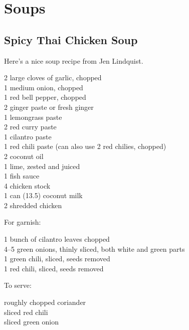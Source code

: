 \chapter{Soups}

\section{Spicy Thai Chicken Soup}

\begin{open}
    Here's a nice soup recipe from Jen Lindquist.
\end{open}
\begin{ingredients}
    2 large cloves of garlic, chopped\\
    1 medium onion, chopped\\
    1 red bell pepper, chopped\\
    \SI{2}{\tblspoon} ginger paste or fresh ginger\\
    \SI{1}{\tblspoon} lemongrass paste\\
    \SI{2}{\tblspoon} red curry paste\\
    \SI{1}{\tblspoon} cilantro paste\\
    \SI{1}{\tblspoon} red chili paste (can also use 2 red chilies, chopped)\\
    \SI{2}{\tblspoon} coconut oil\\
    1 lime, zested and juiced\\
    \SI{1}{\tblspoon} fish sauce\\
    \SI{4}{\cup} chicken stock\\
    1 can (\SI{13.5}{\fluidounce}) coconut milk\\
    \SI{2}{\cup} shredded chicken\\
\end{ingredients}
For garnish:
\begin{ingredients}
    1 bunch of cilantro leaves chopped\\
    \numrange{4}{5} green onions, thinly sliced, both white and green parts\\
    1 green chili, sliced, seeds removed\\
    1 red chili, sliced, seeds removed\\
\end{ingredients}
To serve:
\begin{ingredients}
    roughly chopped coriander\\
    sliced red chili\\
    sliced green onion\\
\end{ingredients}

